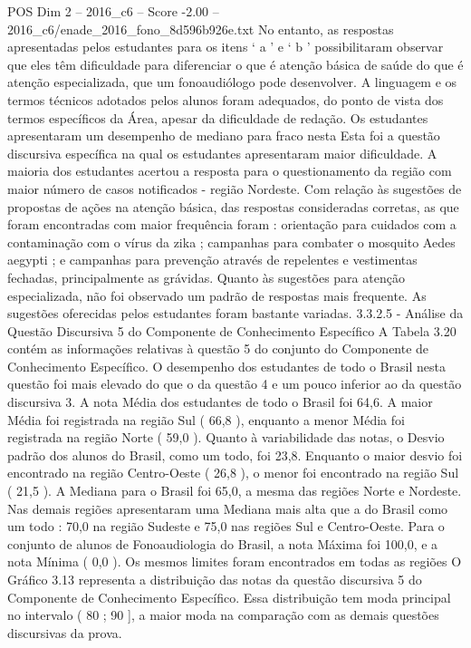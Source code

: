 \begin{textsample}{POS Dim 2 – 2016\_c6 – Score -2.00 – 2016\_c6/enade\_2016\_fono\_8d596b926e.txt}
No entanto, as respostas apresentadas pelos estudantes para os itens ‘ a ’ e ‘ b ’ possibilitaram observar que eles têm dificuldade para diferenciar o que é atenção básica de saúde do que é atenção especializada, que um fonoaudiólogo pode desenvolver.
A linguagem e os termos técnicos adotados pelos alunos foram adequados, do ponto de vista dos termos específicos da Área, apesar da dificuldade de redação.
Os estudantes apresentaram um desempenho de mediano para fraco nesta Esta foi a questão discursiva específica na qual os estudantes apresentaram maior dificuldade.
A maioria dos estudantes acertou a resposta para o questionamento da região com maior número de casos notificados - região Nordeste.
Com relação às sugestões de propostas de ações na atenção básica, das respostas consideradas corretas, as que foram encontradas com maior frequência foram : orientação para cuidados com a contaminação com o vírus da zika ; campanhas para combater o mosquito Aedes aegypti ; e campanhas para prevenção através de repelentes e vestimentas fechadas, principalmente as grávidas.
Quanto às sugestões para atenção especializada, não foi observado um padrão de respostas mais frequente.
As sugestões oferecidas pelos estudantes foram bastante variadas. 3.3.2.5 - Análise da Questão Discursiva 5 do Componente de Conhecimento Específico A Tabela 3.20 contém as informações relativas à questão 5 do conjunto do Componente de Conhecimento Específico.
O desempenho dos estudantes de todo o Brasil nesta questão foi mais elevado do que o da questão 4 e um pouco inferior ao da questão discursiva 3.
A nota Média dos estudantes de todo o Brasil foi 64,6.
A maior Média foi registrada na região Sul ( 66,8 ), enquanto a menor Média foi registrada na região Norte ( 59,0 ).
Quanto à variabilidade das notas, o Desvio padrão dos alunos do Brasil, como um todo, foi 23,8.
Enquanto o maior desvio foi encontrado na região Centro-Oeste ( 26,8 ), o menor foi encontrado na região Sul ( 21,5 ).
A Mediana para o Brasil foi 65,0, a mesma das regiões Norte e Nordeste.
Nas demais regiões apresentaram uma Mediana mais alta que a do Brasil como um todo : 70,0 na região Sudeste e 75,0 nas regiões Sul e Centro-Oeste.
Para o conjunto de alunos de Fonoaudiologia do Brasil, a nota Máxima foi 100,0, e a nota Mínima ( 0,0 ).
Os mesmos limites foram encontrados em todas as regiões O Gráfico 3.13 representa a distribuição das notas da questão discursiva 5 do Componente de Conhecimento Específico.
Essa distribuição tem moda principal no intervalo ( 80 ; 90 ], a maior moda na comparação com as demais questões discursivas da prova.

\end{textsample}
